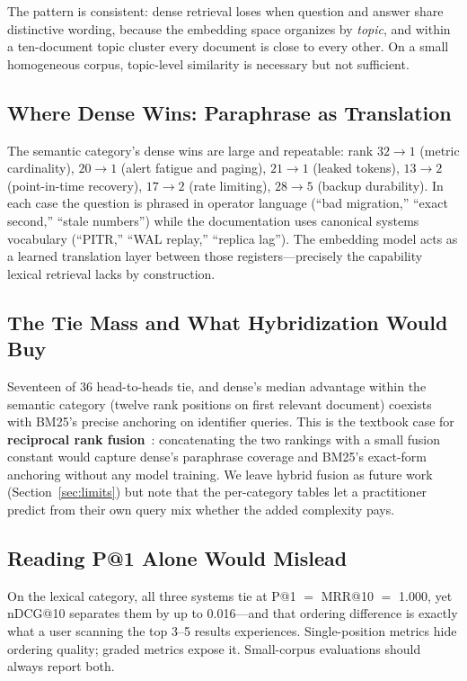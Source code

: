 \documentclass[11pt,a4paper]{article}
\begin{document}
The pattern is consistent: dense retrieval loses when question and answer share distinctive wording, because the embedding space organizes by \emph{topic}, and within a ten-document topic cluster every document is close to every other. On a small homogeneous corpus, topic-level similarity is necessary but not sufficient.

\subsection{Where Dense Wins: Paraphrase as Translation}

The semantic category's dense wins are large and repeatable: rank $32 \to 1$ (metric cardinality), $20 \to 1$ (alert fatigue and paging), $21 \to 1$ (leaked tokens), $13 \to 2$ (point-in-time recovery), $17 \to 2$ (rate limiting), $28 \to 5$ (backup durability). In each case the question is phrased in operator language (``bad migration,'' ``exact second,'' ``stale numbers'') while the documentation uses canonical systems vocabulary (``PITR,'' ``WAL replay,'' ``replica lag''). The embedding model acts as a learned translation layer between those registers---precisely the capability lexical retrieval lacks by construction.

\subsection{The Tie Mass and What Hybridization Would Buy}

Seventeen of 36 head-to-heads tie, and dense's median advantage within the semantic category (twelve rank positions on first relevant document) coexists with BM25's precise anchoring on identifier queries. This is the textbook case for \textbf{reciprocal rank fusion}~\cite{cormack2009}: concatenating the two rankings with a small fusion constant would capture dense's paraphrase coverage and BM25's exact-form anchoring without any model training. We leave hybrid fusion as future work (Section~\ref{sec:limits}) but note that the per-category tables let a practitioner predict from their own query mix whether the added complexity pays.

\subsection{Reading P@1 Alone Would Mislead}

On the lexical category, all three systems tie at P@1 $=$ MRR@10 $=$ 1.000, yet nDCG@10 separates them by up to 0.016---and that ordering difference is exactly what a user scanning the top 3--5 results experiences. Single-position metrics hide ordering quality; graded metrics expose it. Small-corpus evaluations should always report both.
\end{document}
